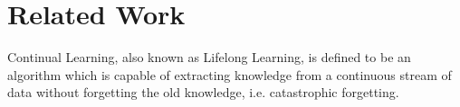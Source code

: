 \section{Related Work}
Continual Learning, also known as Lifelong Learning, is defined to be an algorithm which is capable of extracting knowledge from a continuous stream of data without forgetting the old knowledge, i.e. catastrophic forgetting\cite{parisi2019continual}.  